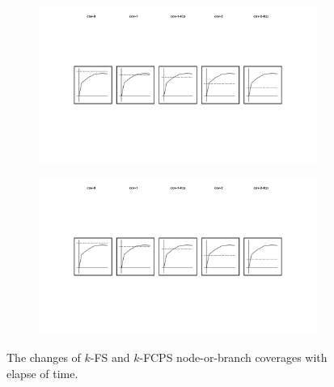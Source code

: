 \begin{figure}
\begin{subfigure}{0.19\textwidth}
  \end{subfigure}
  \begin{subfigure}{0.19\textwidth}
    \centering
    \includegraphics[width=\textwidth]{img/cov-2}
  \end{subfigure}
  \begin{subfigure}{0.19\textwidth}
    \centering
    \includegraphics[width=\textwidth]{img/cov-2-fcp}
  \end{subfigure}
  \caption{
    The changes of $k$-FS and $k$-FCPS node-or-branch coverages with elapse of
    time.
  }
  \label{fig:spec-cfg-id}
\end{figure}

